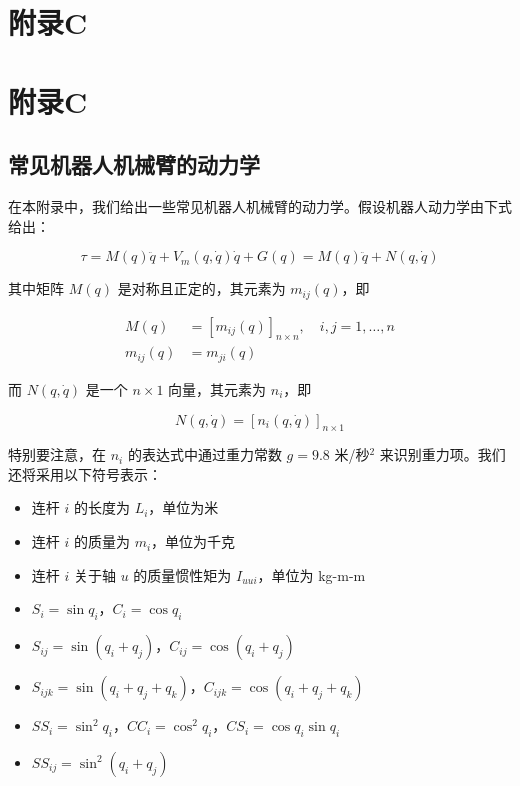 \documentclass[UTF8]{ctexart}
\begin{document}
  \section*{附录C}
\fi

\ifstandalone
\else
  \section*{附录C}
\fi

\subsection*{常见机器人机械臂的动力学}

在本附录中，我们给出一些常见机器人机械臂的动力学。假设机器人动力学由下式给出：

\begin{equation}
\tau = M(q)\ddot{q} + V_m(q, \dot{q})\dot{q} + G(q) = M(q)\ddot{q} + N(q, \dot{q})
\tag{C.1.1}
\end{equation}

其中矩阵 $M(q)$ 是对称且正定的，其元素为 $m_{ij}(q)$，即

\begin{align*}
M(q) &= [m_{ij}(q)]_{n \times n}, \quad i,j = 1, \ldots, n \\
m_{ij}(q) &= m_{ji}(q)
\end{align*}

而 $N(q, \dot{q})$ 是一个 $n \times 1$ 向量，其元素为 $n_i$，即

\begin{equation*}
N(q, \dot{q}) = [n_i(q, \dot{q})]_{n \times 1}
\end{equation*}

特别要注意，在 $n_i$ 的表达式中通过重力常数 $g = 9.8$ 米/秒$^2$ 来识别重力项。我们还将采用以下符号表示：

\begin{itemize}
\item 连杆 $i$ 的长度为 $L_i$，单位为米
\item 连杆 $i$ 的质量为 $m_i$，单位为千克
\item 连杆 $i$ 关于轴 $u$ 的质量惯性矩为 $I_{uui}$，单位为 kg-m-m
\item $S_i = \sin q_i$，$C_i = \cos q_i$
\item $S_{ij} = \sin(q_i + q_j)$，$C_{ij} = \cos(q_i + q_j)$
\item $S_{ijk} = \sin(q_i + q_j + q_k)$，$C_{ijk} = \cos(q_i + q_j + q_k)$
\item $SS_i = \sin^2 q_i$，$CC_i = \cos^2 q_i$，$CS_i = \cos q_i \sin q_i$
\item $SS_{ij} = \sin^2(q_i + q_j)$
\end{itemize}
\end{document}
